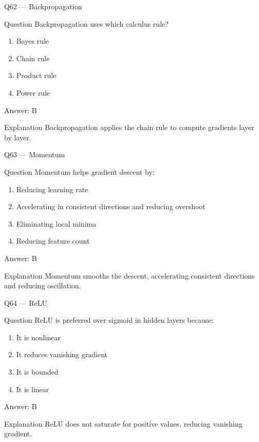 \documentclass[aspectratio=169,8pt]{beamer}
\begin{document}
	\begin{frame}{Q62 --- Backpropagation}
		\begin{block}{Question}
			Backpropagation uses which calculus rule?
		\end{block}
		\begin{enumerate}
			\item Bayes rule
			\item Chain rule
			\item Product rule
			\item Power rule
		\end{enumerate}
		\begin{exampleblock}{Answer: B}\end{exampleblock}
		\begin{block}{Explanation}
			Backpropagation applies the chain rule to compute gradients layer by layer.
		\end{block}
	\end{frame}
	
	\begin{frame}{Q63 --- Momentum}
		\begin{block}{Question}
			Momentum helps gradient descent by:
		\end{block}
		\begin{enumerate}
			\item Reducing learning rate
			\item Accelerating in consistent directions and reducing overshoot
			\item Eliminating local minima
			\item Reducing feature count
		\end{enumerate}
		\begin{exampleblock}{Answer: B}\end{exampleblock}
		\begin{block}{Explanation}
			Momentum smooths the descent, accelerating consistent directions and reducing oscillation.
		\end{block}
	\end{frame}
	
	\begin{frame}{Q64 --- ReLU}
		\begin{block}{Question}
			ReLU is preferred over sigmoid in hidden layers because:
		\end{block}
		\begin{enumerate}
			\item It is nonlinear
			\item It reduces vanishing gradient
			\item It is bounded
			\item It is linear
		\end{enumerate}
		\begin{exampleblock}{Answer: B}\end{exampleblock}
		\begin{block}{Explanation}
			ReLU does not saturate for positive values, reducing vanishing gradient.
		\end{block}
	\end{frame}
	
\end{document}
